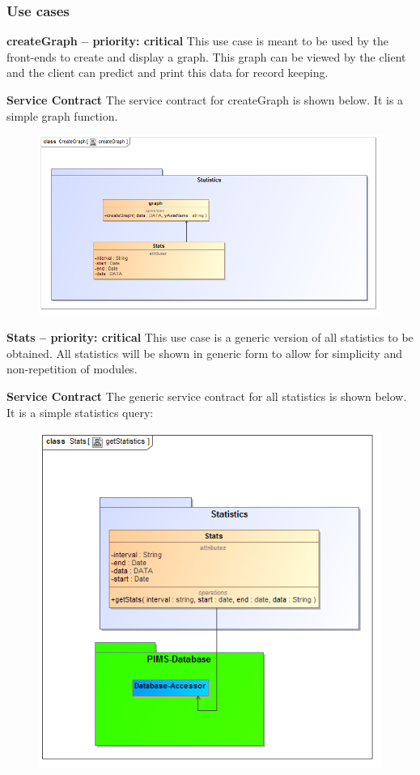 \subsubsection{Use cases}
\begin{description}
	\item{\textbf{createGraph -- priority: critical}} This use case is meant to be used by the front-ends to create and display a graph. This graph can be viewed by the client  and the client can predict and print this data for record keeping.
	\begin{description}
		\item{\textbf{Service Contract}} The service contract for createGraph is shown below. It is a simple graph function.
		\begin{figure}[h!]
			\includegraphics[width=\linewidth]{./Graphics/pimsStats/createGraph}
		\end{figure}
	\end{description}
	\item{\textbf{Stats -- priority: critical}} This use case is a generic version of all statistics to be obtained. All statistics will be shown in generic form to allow for simplicity and non-repetition of modules.
	\begin{description}
		\item{\textbf{Service Contract}} The generic service contract for all statistics is shown below. It is a simple statistics query:
		\begin{figure}[h!]
			\includegraphics[width=0.5\linewidth]{./Graphics/pimsStats/getStatistics}
		\end{figure}
	\end{description}
\end{description}

